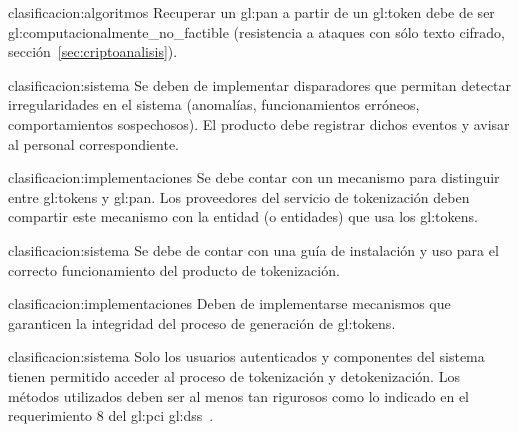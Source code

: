 {clasificacion:algoritmos}
{
  Recuperar un \gls{gl:pan} a partir de un \gls{gl:token} debe de ser
  \gls{gl:computacionalmente_no_factible} (resistencia a ataques con sólo
  texto cifrado, sección~\ref{sec:criptoanalisis}).
}

{clasificacion:sistema}
{
  Se deben de implementar disparadores que permitan detectar
  irregularidades en el sistema (anomalías, funcionamientos erróneos,
  comportamientos sospechosos). El producto debe registrar dichos eventos y
  avisar al personal correspondiente.
}

{clasificacion:implementaciones}
{
  Se debe contar con un mecanismo para distinguir entre \glspl{gl:token}
  y \gls{gl:pan}. Los proveedores del servicio de tokenización deben
  compartir este mecanismo con la entidad (o entidades) que usa los
  \glspl{gl:token}.
}

{clasificacion:sistema}
{
  Se debe de contar con una guía de instalación y uso para el correcto
  funcionamiento del producto de tokenización.
}

{clasificacion:implementaciones}
{
  Deben de implementarse mecanismos que garanticen la integridad del proceso
  de generación de \glspl{gl:token}.
}

{clasificacion:sistema}
{
  Solo los usuarios autenticados y componentes del sistema tienen permitido
  acceder al proceso de tokenización y detokenización. Los métodos utilizados
  deben ser al menos tan rigurosos como lo indicado en el requerimiento 8 del
  \gls{gl:pci} \gls{gl:dss}~\cite{pci_dss}.
}

